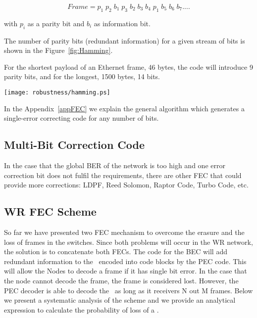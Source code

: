 \begin{equation}
	Frame =    p_1\;  p_2 \;  b_1 \;  p_3 \;  b_2 \;  b_3 \;  b_4 \;  p_1  \;  b_5 \; b_6  \; b_7 .... 
\end{equation}

with $p_i$ as a parity bit and $b_i$ as information bit. 


The number of parity bits (redundant information) for a given stream of bits is
shown in the Figure~\ref{fig:Hamming}.

For the shortest payload of an Ethernet frame, 46 bytes, the code will introduce
9 parity bits, and for the longest, 1500 bytes, 14 bits.

\begin{center}
        \texttt{[image: robustness/hamming.ps]}
        \label{fig:Hamming}
\end{center}

In the Appendix~\ref{appFEC} we explain the general algorithm which generates a
single-error correcting code for any number of bits. 

\subsection{Multi-Bit Correction Code}

In the case that the global BER of the network is too high and one error
correction bit does not fulfil the requirements, there are other FEC that
could provide more corrections: LDPF, Reed Solomon, Raptor Code, Turbo
Code, etc.

\subsection{WR FEC Scheme}

So far we have presented two FEC mechanism to overcome the erasure and the loss of frames in the switches. Since both problems will occur in the WR network, the solution is to concatenate both FECs. The code for the BEC will add
redundant information to the \ControlMessage\ encoded into code blocks by the
PEC code. This will allow the Nodes to decode a frame if
it has single bit error. In the case that the node cannot decode the frame,
the frame is considered lost. However, the PEC decoder is able
to decode the \ControlMessage\ as long as it receivers N out M frames. Below we
present a systematic analysis of the scheme and we provide an analytical
expression to calculate the probability of loss of a \ControlMessage.


